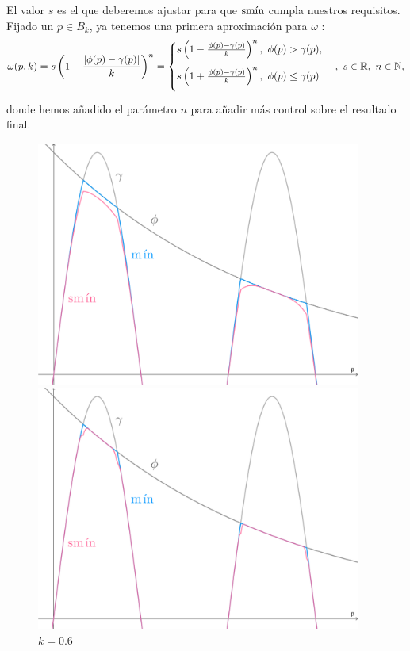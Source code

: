 El valor $s$ es el que deberemos ajustar para que $\smin$ cumpla nuestros requisitos. Fijado un $p\in B_{k}$, ya tenemos una primera aproximación para $\omega$ :
\begin{equation*}
    \omega(p,k) = s\left( 1-\frac{|\phi(p)-\gamma(p)|}{k} \right)^n = \begin{cases}
        s\left( 1-\frac{\phi(p)-\gamma(p)}{k}\right)^n,\ \phi(p)>\gamma(p), \\[10pt]
        s\left( 1+\frac{\phi(p)-\gamma(p)}{k}\right)^n,\ \phi(p)\le \gamma(p)\\[10pt]
    \end{cases}  ,\ s\in\R,\ n\in\N,
\end{equation*}
donde hemos añadido el parámetro $n$ para añadir más control sobre el resultado final.\newline 
\begin{figure}[!h]
     \begin{minipage}[c]{0.49\linewidth}
        \centering
        \includegraphics[width=0.95\textwidth]{Plantilla-TFG-master/img/smin_1.png}
        \caption{$k=0.6$}
     \end{minipage}
     \begin{minipage}[c]{0.49\linewidth}
        \centering
        \includegraphics[width=0.95\textwidth]{Plantilla-TFG-master/img/smin_2.png}

\end{minipage}
\end{figure}
